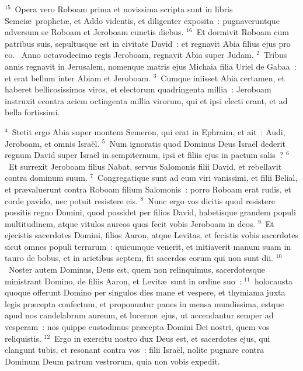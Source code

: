 ${}^{15}$~Opera vero Roboam prima et novissima scripta sunt in libris Semei\ae\ prophet\ae , et Addo videntis, et diligenter exposita~: pugnaveruntque adversum se Roboam et Jeroboam cunctis diebus.
${}^{16}$~Et dormivit Roboam cum patribus suis, sepultusque est in civitate David~: et regnavit Abia filius ejus pro eo.
~Anno octavodecimo regis Jeroboam, regnavit Abia super Judam.
${}^{2}$~Tribus annis regnavit in Jerusalem, nomenque matris ejus Michaia filia Uriel de Gabaa~: et erat bellum inter Abiam et Jeroboam.
${}^{3}$~Cumque iniisset Abia certamen, et haberet bellicosissimos viros, et electorum quadringenta millia~: Jeroboam instruxit econtra aciem octingenta millia virorum, qui et ipsi electi erant, et ad bella fortissimi.


${}^{4}$~Stetit ergo Abia super montem Semeron, qui erat in Ephraim, et ait~: Audi, Jeroboam, et omnis Isra\"el.
${}^{5}$~Num ignoratis quod Dominus Deus Isra\"el dederit regnum David super Isra\"el in sempiternum, ipsi et filiis ejus in pactum salis~?
${}^{6}$~Et surrexit Jeroboam filius Nabat, servus Salomonis filii David, et rebellavit contra dominum suum.
${}^{7}$~Congregatique sunt ad eum viri vanissimi, et filii Belial, et pr\ae valuerunt contra Roboam filium Salomonis~: porro Roboam erat rudis, et corde pavido, nec potuit resistere eis.
${}^{8}$~Nunc ergo vos dicitis quod resistere possitis regno Domini, quod possidet per filios David, habetisque grandem populi multitudinem, atque vitulos aureos quos fecit vobis Jeroboam in deos.
${}^{9}$~Et ejecistis sacerdotes Domini, filios Aaron, atque Levitas, et fecistis vobis sacerdotes sicut omnes populi terrarum~: quicumque venerit, et initiaverit manum suam in tauro de bobus, et in arietibus septem, fit sacerdos eorum qui non sunt dii.
${}^{10}$~Noster autem Dominus, Deus est, quem non relinquimus, sacerdotesque ministrant Domino, de filiis Aaron, et Levit\ae\ sunt in ordine suo~:
${}^{11}$~holocausta quoque offerunt Domino per singulos dies mane et vespere, et thymiama juxta legis pr\ae cepta confectum, et proponuntur panes in mensa mundissima, estque apud nos candelabrum aureum, et lucern\ae\ ejus, ut accendantur semper ad vesperam~: nos quippe custodimus pr\ae cepta Domini Dei nostri, quem vos reliquistis.
${}^{12}$~Ergo in exercitu nostro dux Deus est, et sacerdotes ejus, qui clangunt tubis, et resonant contra vos~: filii Isra\"el, nolite pugnare contra Dominum Deum patrum vestrorum, quia non vobis expedit.


